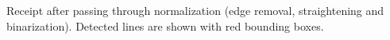 Receipt after passing through normalization (edge removal, straightening and binarization). Detected lines are shown with red bounding boxes. 